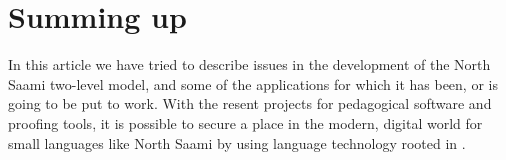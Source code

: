 \documentclass[a4paper,english]{article}
\begin{document}
\section{Summing up}

In this article we have tried to describe issues in the development of the North Saami two-level model, and some of the applications for which it has been, or is going to be put to work. With the resent projects for pedagogical software and proofing tools, it is possible to secure a place in the modern, digital world for small languages like North Saami by using language technology rooted in \cite{Koskenniemi83}.
 



\end{document}

